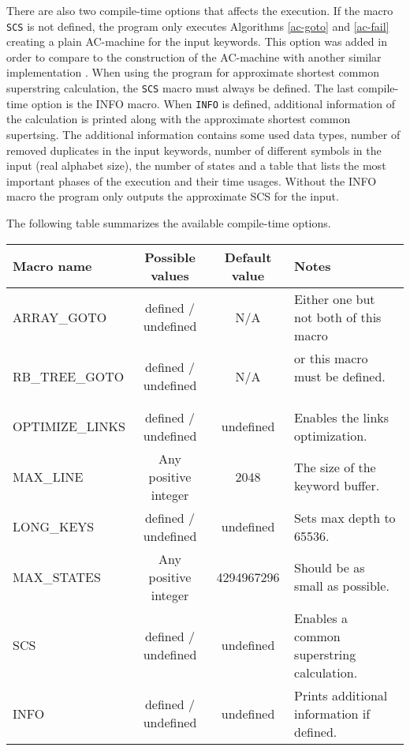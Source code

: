 \documentclass[english,twoside,censored,csm,algorithms-track-2020]{HYthesisML}
\theoremstyle{plain}
\theoremstyle{definition}
\begin{document}
There are also two compile-time options that affects the execution. If the macro \texttt{SCS}
is not defined,
the program only executes Algorithms \ref{ac-goto} and \ref{ac-fail} creating a plain AC-machine
for the input keywords. This option was added in order to compare to the construction of the
AC-machine with another similar implementation \citep{Salmela06}. When using the program for approximate
shortest common superstring calculation, the \texttt{SCS} macro must always be defined. The last
compile-time option is the INFO macro. When \texttt{INFO} is defined, additional information
of the calculation
is printed along with the approximate shortest common supertsing. The additional information contains
some used data types, number of removed duplicates in the input keywords, number of different symbols
in the input (real alphabet size), the number of states and a table that lists the most important
phases of the execution and their time usages. Without the INFO macro the program only outputs
the approximate SCS for the input.

The following table summarizes the available compile-time options.\\

\hspace{-1.7cm}
  \begin{tabular}{ |l|c|c|l| }
    \hline
    \textbf{Macro name} & \textbf{Possible values} & \textbf{Default value} & \textbf{Notes} \\
 \hline
 ARRAY\_GOTO & defined / undefined & N/A & Either one but not both of this macro \\
 RB\_TREE\_GOTO & defined / undefined & N/A & or this macro must be defined. ~~~ \\
 OPTIMIZE\_LINKS & defined / undefined  & undefined & Enables the links optimization.\\
 MAX\_LINE & Any positive integer & 2048 & The size of the keyword buffer. \\
 LONG\_KEYS & defined / undefined & undefined & Sets max depth to 65536. \\
 MAX\_STATES & Any positive integer & 4294967296 & Should be as small as possible. \\
 SCS & defined / undefined & undefined & Enables a common superstring calculation. \\
 INFO & defined / undefined & undefined & Prints additional information if defined.\\
 \hline
  \end{tabular}
\end{document}
